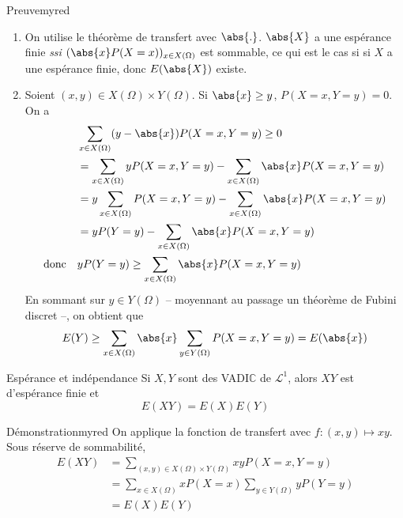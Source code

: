     \begin{demo}{Preuve}{myred}
        \begin{enumerate}
            \item On utilise le théorème de transfert avec $\abs{.}$. $\abs{X}$ a une espérance finie \textit{ssi} $(\abs{x}P(X=x))_{x \in X(\Omega)}$ est sommable, ce qui est le cas si si $X$ a une espérance finie, donc $E(\abs{X})$ existe.
            \item Soient $(x,y) \in X(\Omega) \times Y(\Omega)$. Si $\abs{x} \geq y$, $P(X=x,Y=y) = 0$. On a 
            \begin{align*}
                &\sum_{x \in X(\Omega)} (y - \abs{x}) P(X= x, Y =y) \geq 0 \\
                &= \sum_{x \in X(\Omega)} y P(X = x,Y=y) - \sum_{x \in X(\Omega)} \abs{x} P(X = x, Y = y) \\
                &= y \sum_{x \in X(\Omega)} P(X = x, Y = y) - \sum_{x \in X(\Omega)} \abs{x} P(X = x, Y = y) \\
                &= y P(Y = y) - \sum_{x \in X(\Omega)} \abs{x} P(X = x, Y = y) \\
                \text{donc} \quad &y P(Y = y) \geq \sum_{x \in X(\Omega)} \abs{x} P(X=x,Y=y) 
            \end{align*}
            En sommant sur $y \in Y(\Omega)$ -- moyennant au passage un théorème de Fubini discret --, on obtient que 
            \begin{align*}
                E(Y) \geq \sum_{x \in X(\Omega)} \abs{x} \sum_{y \in Y(\Omega)} P(X=x, Y=y) = E(\abs{x}) 
            \end{align*}
        \end{enumerate}
    \end{demo}

    \begin{theo}{Espérance et indépendance}{}
        Si $X,Y$ sont des VADI$\mathbb{C}$ de $\mathcal{L}^1$, alors $XY$ est d’espérance finie et 
        \[ E(XY) = E(X)E(Y) \]   
    \end{theo}

    \begin{demo}{Démonstration}{myred}
        On applique la fonction de transfert avec $f : (x,y) \mapsto xy$. Sous réserve de sommabilité, 
        \begin{align*}
            E(XY) &= \sum_{(x,y) \in X(\Omega) \times Y(\Omega)} xy P(X = x, Y = y) \\ 
            &= \sum_{x \in X(\Omega)} x P(X = x) \sum_{y \in Y(\Omega)} y P(Y = y) \\
            &= E(X) E(Y)
        \end{align*}
    \end{demo}

